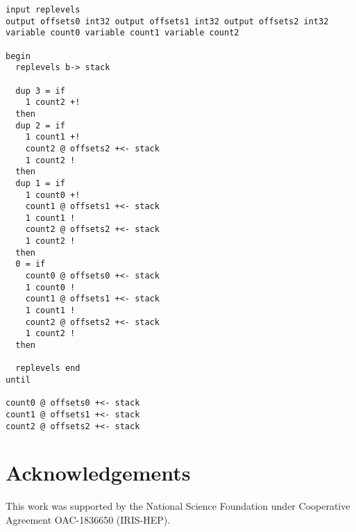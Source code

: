 \documentclass{webofc}
\begin{document}
\begin{Verbatim}[commandchars=\\\{\}]
input replevels
output offsets0 int32 output offsets1 int32 output offsets2 int32
variable count0 variable count1 variable count2

begin
  replevels b-> stack

  dup 3 = if
    1 count2 +!
  then
  dup 2 = if
    1 count1 +!
    count2 @ offsets2 +<- stack
    1 count2 !
  then
  dup 1 = if
    1 count0 +!
    count1 @ offsets1 +<- stack
    1 count1 !
    count2 @ offsets2 +<- stack
    1 count2 !
  then
  0 = if
    count0 @ offsets0 +<- stack
    1 count0 !
    count1 @ offsets1 +<- stack
    1 count1 !
    count2 @ offsets2 +<- stack
    1 count2 !
  then

  replevels end
until

count0 @ offsets0 +<- stack
count1 @ offsets1 +<- stack
count2 @ offsets2 +<- stack
\end{Verbatim}

\section{Acknowledgements}

This work was supported by the National Science Foundation under Cooperative Agreement OAC-1836650 (IRIS-HEP).






\end{document}
